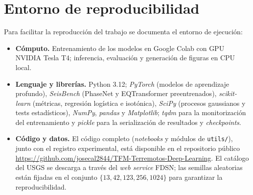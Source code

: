 \section{Entorno de reproducibilidad}
\label{apendice-reproducibilidad}

Para facilitar la reproducción del trabajo se documenta el entorno de ejecución:

\begin{itemize}
  \item \textbf{Cómputo.} Entrenamiento de los modelos en Google Colab con GPU NVIDIA Tesla T4;
        inferencia, evaluación y generación de figuras en CPU local.
  \item \textbf{Lenguaje y librerías.} Python 3.12; \textit{PyTorch} (modelos de aprendizaje
        profundo), \textit{SeisBench} (PhaseNet y EQTransformer preentrenados), \textit{scikit-learn}
        (métricas, regresión logística e isotónica), \textit{SciPy} (procesos gaussianos y tests
        estadísticos), \textit{NumPy}, \textit{pandas} y \textit{Matplotlib}; \textit{tqdm} para la
        monitorización del entrenamiento y \textit{pickle} para la serialización de resultados y
        \textit{checkpoints}.
  \item \textbf{Código y datos.} El código completo (\textit{notebooks} y módulos de \texttt{utils/}),
        junto con el registro experimental, está disponible en el repositorio público
        \url{https://github.com/josecal2844/TFM-Terremotos-Deep-Learning}. El catálogo del USGS se
        descarga a través del \textit{web service} FDSN; las semillas aleatorias están fijadas en el
        conjunto \(\{13, 42, 123, 256, 1024\}\) para garantizar la reproducibilidad.
\end{itemize}
